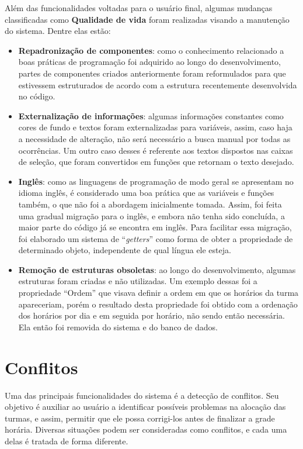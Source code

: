 Além das funcionalidades voltadas para o usuário final, algumas mudanças classificadas como \textbf{Qualidade de vida} foram realizadas visando a manutenção do sistema. Dentre elas estão:

\begin{itemize}
  \item \textbf{Repadronização de componentes}: como o conhecimento relacionado a boas práticas de programação foi adquirido ao longo do desenvolvimento, partes de componentes criados anteriormente foram reformulados para que estivessem estruturados de acordo com a estrutura recentemente desenvolvida no código.
  \item \textbf{Externalização de informações}: algumas informações constantes como cores de fundo e textos foram externalizadas para variáveis, assim, caso haja a necessidade de alteração, não será necessário a busca manual por todas as ocorrências. Um outro caso desses é referente aos textos dispostos nas caixas de seleção, que foram convertidos em funções que retornam o texto desejado.
  \item \textbf{Inglês}: como as linguagens de programação de modo geral se apresentam no idioma inglês, é considerado uma boa prática que as variáveis e funções também, o que não foi a abordagem inicialmente tomada. Assim, foi feita uma gradual migração para o inglês, e embora não tenha sido concluída, a maior parte do código já se encontra em inglês. Para facilitar essa migração, foi elaborado um sistema de ``\textit{getters}'' como forma de obter a propriedade de determinado objeto, independente de qual língua ele esteja.
  \item \textbf{Remoção de estruturas obsoletas}: ao longo do desenvolvimento, algumas estruturas foram criadas e não utilizadas. Um exemplo dessas foi a propriedade ``Ordem'' que visava definir a ordem em que os horários da turma apareceriam, porém o resultado desta propriedade foi obtido com a ordenação dos horários por dia e em seguida por horário, não sendo então necessária. Ela então foi removida do sistema e do banco de dados.
\end{itemize}

\section{Conflitos} \label{sec:conflitos} %

Uma das principais funcionalidades do sistema é a detecção de conflitos. Seu objetivo é auxiliar ao usuário a identificar possíveis problemas na alocação das turmas, e assim, permitir que ele possa corrigi-los antes de finalizar a grade horária. Diversas situações podem ser consideradas como conflitos, e cada uma delas é tratada de forma diferente.

